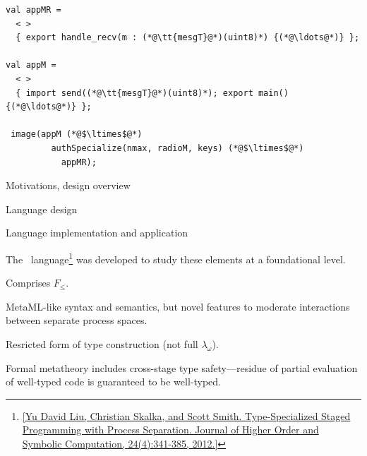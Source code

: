 
\begin{lstlisting}[language=scalaness]
val appMR =
  < >
  { export handle_recv(m : (*@\tt{mesgT}@*)(uint8)*) {(*@\ldots@*)} }; 

val appM = 
  < >
  { import send((*@\tt{mesgT}@*)(uint8)*); export main() {(*@\ldots@*)} };  

 image(appM (*@$\ltimes$@*)
         authSpecialize(nmax, radioM, keys) (*@$\ltimes$@*)
           appMR);
\end{lstlisting}
\stopslide


\begin{cenumerate}
\item Motivations, design overview
\item {}
\begin{citemize}
\item Language design 
\item {}
\end{citemize}
\item Language implementation and application
\end{cenumerate}
\stopslide


 The \fml\ language\footnote{\cref{Yu David Liu, Christian Skalka,
    and Scott Smith. Type-Specialized Staged Programming with Process Separation. Journal of
    Higher Order and Symbolic Computation, 24(4):341-385, 2012.}} was developed to study these
elements at a foundational level.
\begin{citemize}
\item Comprises $F_{\le}$.
\item MetaML-like syntax and semantics, but novel features to moderate interactions between
  separate process spaces.
\item Resricted form of type construction (not full $\lambda_\omega$).
\item Formal metatheory includes cross-stage type safety---residue of partial evaluation of
  well-typed code is guaranteed to be well-typed.
\end{citemize}
\stopslide


